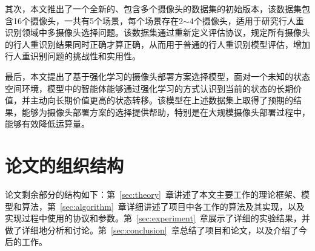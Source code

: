 其次，本文推出了一个全新的、包含多个摄像头的数据集的初始版本，该数据集包含16个摄像头，一共有5个场景，每个场景存在2$\sim$4个摄像头，适用于研究行人重识别领域中多摄像头选择问题。该数据集通过重新定义评估协议，规定所有摄像头的行人重识别结果同时正确才算正确，从而用于普通的行人重识别模型评估，增加行人重识别问题的挑战性和实用性。

最后，本文提出了基于强化学习的摄像头部署方案选择模型，面对一个未知的状态空间环境，模型中的智能体能够通过强化学习的方式认识到当前的状态的长期价值，并主动向长期价值更高的状态转移。该模型在上述数据集上取得了预期的结果，能够为摄像头部署方案的选择提供帮助，特别是在大规模摄像头部署过程中，能够有效降低运算量。

\section{论文的组织结构}

论文剩余部分的结构如下：第~\ref{sec:theory}~章讲述了本文主要工作的理论框架、模型和算法，第~\ref{sec:algorithm}~章详细讲述了项目中各工作的算法及其实现，以及实现过程中使用的协议和参数。第~\ref{sec:experiment}~章展示了详细的实验结果，并做了详细地分析和讨论。第~\ref{sec:conclusion}~章总结了项目和论文，以及介绍了今后的工作。
